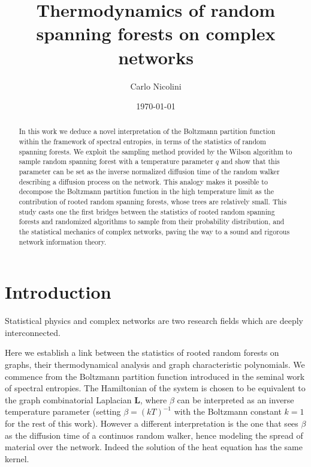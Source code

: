 \documentclass[10pt,aps,pre,twocolumn,nofootinbib,superscriptaddress,longbibliography]{revtex4-1}
\newcommand{\bL}{\mathbf{L}}
\begin{document}
\title{Thermodynamics of random spanning forests on complex networks}
\author{Carlo Nicolini}
\date{\today}

\begin{abstract}
In this work we deduce a novel interpretation of the Boltzmann partition function within the framework of spectral entropies, in terms of the statistics of random spanning forests. 
We exploit the sampling method provided by the Wilson algorithm to sample random spanning forest with a temperature parameter $q$ and show that this parameter can be set as the inverse normalized diffusion time of the random walker describing a diffusion process on the network.
This analogy makes it possible to decompose the Boltzmann partition function in the high temperature limit as the contribution of rooted random spanning forests, whose trees are relatively small.
This study casts one the first bridges between the statistics of rooted random spanning forests and randomized algorithms to sample from their probability distribution, and the statistical mechanics of complex networks, paving the way to a sound and rigorous network information theory.
\end{abstract}
\maketitle

\section{Introduction}
Statistical physics and complex networks are two research fields which are deeply interconnected.

Here we establish a link between the statistics of rooted random forests on graphs, their thermodynamical analysis and graph characteristic polynomials.
We commence from the Boltzmann partition function introduced in the seminal work of spectral entropies.
The Hamiltonian of the system is chosen to be equivalent to the graph combinatorial Laplacian $\bL$, where $\beta$ can be interpreted as an inverse temperature parameter (setting $\beta=(k T)^{-1}$ with the Boltzmann constant $k=1$ for the rest of this work).
However a different interpretation is the one that sees $\beta$ as the diffusion time of a continuos random walker, hence modeling the spread of material over the network. Indeed the solution of the heat equation has the same kernel.
\end{document}
